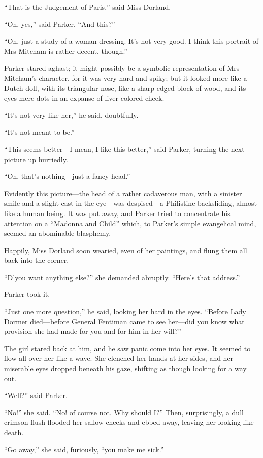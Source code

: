 \enquote{That is the Judgement of Paris,} said Miss Dorland.

\enquote{Oh, yes,} said Parker. \enquote{And this?}

\enquote{Oh, just a study of a woman dressing. It's not very good. I think this portrait of Mrs Mitcham is rather decent, though.}

Parker stared aghast; it might possibly be a symbolic representation of Mrs Mitcham's character, for it was very hard and spiky; but it looked more like a Dutch doll, with its triangular nose, like a sharp-edged block of wood, and its eyes mere dots in an expanse of liver-colored cheek.

\enquote{It's not very like her,} he said, doubtfully.

\enquote{It's not meant to be.}

\enquote{This seems better\allowbreak---\allowbreak I mean, I like this better,} said Parker, turning the next picture up hurriedly.

\enquote{Oh, that's nothing\allowbreak---\allowbreak just a fancy head.}

Evidently this picture\allowbreak---\allowbreak the head of a rather cadaverous man, with a sinister smile and a slight cast in the eye\allowbreak---\allowbreak was despised\allowbreak---\allowbreak a Philistine backsliding, almost like a human being. It was put away, and Parker tried to concentrate his attention on a \enquote{Madonna and Child} which, to Parker's simple evangelical mind, seemed an abominable blasphemy.

Happily, Miss Dorland soon wearied, even of her paintings, and flung them all back into the corner.

\enquote{D'you want anything else?} she demanded abruptly. \enquote{Here's that address.}

Parker took it.

\enquote{Just one more question,} he said, looking her hard in the eyes. \enquote{Before Lady Dormer died\allowbreak---\allowbreak before General Fentiman came to see her\allowbreak---\allowbreak did you know what provision she had made for you and for him in her will?}

The girl stared back at him, and he saw panic come into her eyes. It seemed to flow all over her like a wave. She clenched her hands at her sides, and her miserable eyes dropped beneath his gaze, shifting as though looking for a way out.

\enquote{Well?} said Parker.

\enquote{No!} she said. \enquote{No! of course not. Why should I?} Then, surprisingly, a dull crimson flush flooded her sallow cheeks and ebbed away, leaving her looking like death.

\enquote{Go away,} she said, furiously, \enquote{you make me sick.}
